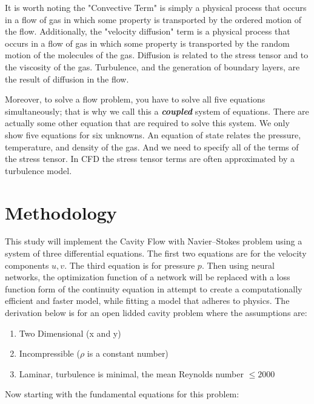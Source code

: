 \documentclass{article}
\begin{document}
It is worth noting the "Convective Term" is simply a physical process that
occurs in a flow of gas in which some property is transported by the ordered
motion of the flow.\cite{NASA}
Additionally, the "velocity diffusion" term is a physical process that
occurs in a flow of gas in which some property is transported by the random
motion of the molecules of the gas. Diffusion is related to the stress tensor
and to the viscosity of the gas. Turbulence, and the generation of boundary
layers, are the result of diffusion in the flow.

Moreover, to solve a flow problem, you have to solve all five equations
simultaneously; that is why we call this a \textit{\textbf{coupled}} system of
equations. There are actually some other equation that are required to solve
this system. We only show five equations for six unknowns. An equation of state
relates the pressure, temperature, and density of the gas. And we need to
specify all of the terms of the stress tensor. In CFD the stress tensor terms
are often approximated by a turbulence model. \cite{NASA}

\section{Methodology\cite{Barba2019}}\label{methodology}

This study will implement the Cavity Flow with Navier–Stokes problem
using a system of three differential equations. The first two equations are for
the velocity components $u,v$. The third equation is for pressure $p$. Then
using neural networks, the optimization function of a network will be replaced
with a loss function form of the continuity equation in attempt to create a
computationally efficient and faster model, while fitting a model that adheres
to physics. The derivation below is for an open lidded cavity problem where the
assumptions are:

\begin{enumerate}
	\item Two Dimensional (x and y)
	\item Incompressible ($\rho$ is a constant number)
	\item Laminar, turbulence is minimal, the mean Reynolds number $\le
		      2000$
\end{enumerate}

\noindent Now starting with the fundamental equations for this
problem:\\
\end{document}
